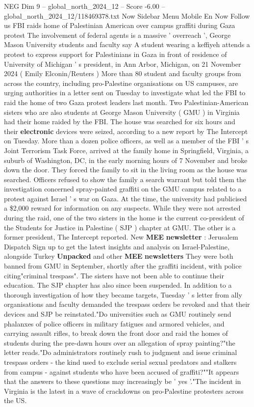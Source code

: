 \begin{textsample}{NEG Dim 9 – global\_north\_2024\_12 – Score -6.00 – global\_north\_2024\_12/118469378.txt}  \label{ex:f9_neg_120}
Now Sidebar Menu Mobile En Now Follow us FBI raids home of Palestinian American over campus graffiti during Gaza protest The involvement of federal agents is a massive ' overreach ', George Mason University students and faculty say A student wearing a keffiyeh attends a protest to express support for Palestinians in Gaza in front of residence of University of Michigan ' s president, in Ann Arbor, Michigan, on 21 November 2024 ( Emily Elconin/Reuters ) More than 80 student and faculty groups from across the country, including pro-Palestine organisations on US campuses, are urging authorities in a letter sent on Tuesday to investigate what led the FBI to raid the home of two Gaza protest leaders last month.
Two Palestinian-American sisters who are also students at George Mason University ( GMU ) in Virginia had their home raided by the FBI.
The house was searched for six hours and their \textbf{electronic} devices were seized, according to a new report by The Intercept on Tuesday.
More than a dozen police officers, as well as a member of the FBI ' s Joint Terrorism Task Force, arrived at the family home in Springfield, Virginia, a suburb of Washington, DC, in the early morning hours of 7 November and broke down the door.
They forced the family to sit in the living room as the house was searched.
Officers refused to show the family a search warrant but told them the investigation concerned spray-painted graffiti on the GMU campus related to a protest against Israel ' s war on Gaza.
At the time, the university had publicised a \$2,000 reward for information on any suspects.
While they were not arrested during the raid, one of the two sisters in the home is the current co-president of the Students for Justice in Palestine ( SJP ) chapter at GMU.
The other is a former president, The Intercept reported.
New \textbf{MEE} \textbf{newsletter} : Jerusalem Dispatch Sign up to get the latest insights and analysis on Israel-Palestine, alongside Turkey \textbf{Unpacked} and other \textbf{MEE} \textbf{newsletters} They were both banned from GMU in September, shortly after the graffiti incident, with police citing"criminal trespass".
The sisters have not been able to continue their education.
The SJP chapter has also since been suspended.
In addition to a thorough investigation of how they became targets, Tuesday ' s letter from ally organisations and faculty demanded the trespass orders be revoked and that their devices and SJP be reinstated."Do universities such as GMU routinely send phalanxes of police officers in military fatigues and armored vehicles, and carrying assault rifles, to break down the front door and raid the homes of students during the pre-dawn hours over an allegation of spray painting?"the letter reads."Do administrators routinely rush to judgment and issue criminal trespass orders - the kind used to exclude serial sexual predators and stalkers from campus - against students who have been accused of graffiti?""It appears that the answers to these questions may increasingly be ' yes '."The incident in Virginia is the latest in a wave of crackdowns on pro-Palestine protesters across the US.

\end{textsample}
